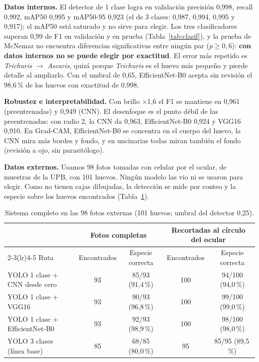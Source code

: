 \documentclass[10pt,letterpaper]{article}
\begin{document}
\textbf{Datos internos.} El detector de 1 clase logra en validación precisión 0,998, recall 0,992, mAP50 0,995 y mAP50-95 0,923 (el de 3 clases: 0,987, 0,994, 0,995 y 0,917); el mAP50 está saturado y no sirve para elegir. Los tres clasificadores superan 0,99 de F1 en validación y en prueba (Tabla~\ref{tab:clasif}), y la prueba de McNemar no encuentra diferencias significativas entre ningún par ($p \geq 0{,}6$): \textbf{con datos internos no se puede elegir por exactitud}. El error más repetido es \textit{Trichuris} $\to$ \textit{Ascaris}, quizá porque \textit{Trichuris} es el huevo más pequeño y pierde detalle al ampliarlo. Con el umbral de 0,65, EfficientNet-B0 acepta sin revisión el 98,6\,\% de los huevos con exactitud de 0,998.

\textbf{Robustez e interpretabilidad.} Con brillo $\times$1,6 el F1 se mantiene en 0,961 (preentrenadas) y 0,949 (CNN). El desenfoque es el punto débil de las preentrenadas: con radio 2, la CNN da 0,963, EfficientNet-B0 0,924 y VGG16 0,910. En Grad-CAM, EfficientNet-B0 se concentra en el cuerpo del huevo, la CNN mira más bordes y fondo, y en uncinarias todas miran también el fondo (revisión a ojo, sin parasitólogo).

\textbf{Datos externos.} Usamos 98 fotos tomadas con celular por el ocular, de muestras de la UPB, con 101 huevos. Ningún modelo las vio ni se usaron para elegir. Como no tienen cajas dibujadas, la detección se mide por conteo y la especie sobre los huevos encontrados (Tabla~\ref{tab:externas}).

\begin{table}[h]
\centering\small
\caption{Sistema completo en las 98 fotos externas (101 huevos; umbral del detector 0,25).}
\label{tab:externas}
\begin{tabular}{lcccc}
\toprule
 & \multicolumn{2}{c}{Fotos completas} & \multicolumn{2}{c}{Recortadas al círculo del ocular} \\
\cmidrule(lr){2-3}\cmidrule(lr){4-5}
Ruta & Encontrados & Especie correcta & Encontrados & Especie correcta \\
\midrule
YOLO 1 clase + CNN desde cero   & 93 & 85/93 (91,4\,\%) & 100 & 94/100 (94,0\,\%) \\
YOLO 1 clase + VGG16            & 93 & 90/93 (96,8\,\%) & 100 & 99/100 (99,0\,\%) \\
YOLO 1 clase + EfficientNet-B0  & 93 & 92/93 (98,9\,\%) & 100 & 98/100 (98,0\,\%) \\
YOLO 3 clases (línea base)      & 85 & 68/85 (80,0\,\%) &  95 & 85/95 (89,5\,\%) \\
\bottomrule
\end{tabular}
\end{table}
\end{document}

